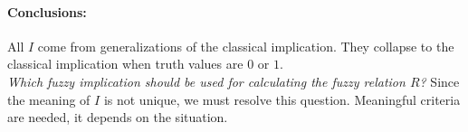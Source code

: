 \documentclass[11pt]{article}
\begin{document}
		\paragraph{Conclusions:} All $I$ come from generalizations of the classical implication. They collapse to the classical implication when truth values are $0$ or $1$. \\
		
		\textit{Which fuzzy implication should be used for calculating the fuzzy relation $R$?} Since the meaning of $I$ is not unique, we must resolve this question. Meaningful criteria are needed, it depends on the situation. \\
		
		\newpage
		
		
		
		
		
		
		
		
	
\end{document}

